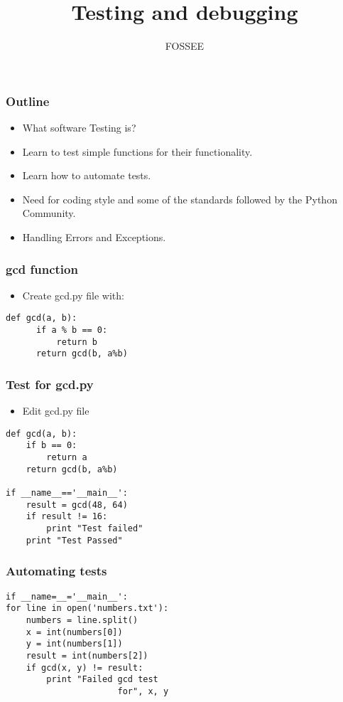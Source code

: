 \documentclass[presentation]{beamer}
\title{Testing and debugging}
\author{FOSSEE}
\date{}
\begin{document}
\maketitle









\begin{frame}
\frametitle{Outline}
\label{sec-1}

\begin{itemize}
\item What software Testing is?
\item Learn to test simple functions for their functionality.
\item Learn how to automate tests.
\item Need for coding style and some of the standards followed by the Python Community.
\item Handling Errors and Exceptions.
\end{itemize}
\end{frame}
\begin{frame}[fragile]
\frametitle{gcd function}
\label{sec-2}

\begin{itemize}
\item Create gcd.py file with:
\end{itemize}

\begin{verbatim}
def gcd(a, b):
      if a % b == 0: 
          return b
      return gcd(b, a%b)
\end{verbatim}
\end{frame}
\begin{frame}[fragile]
\frametitle{Test for gcd.py}
\label{sec-3}

\begin{itemize}
\item Edit gcd.py file
\end{itemize}

\begin{verbatim}
def gcd(a, b):
    if b == 0:
        return a
    return gcd(b, a%b)

if __name__=='__main__':
    result = gcd(48, 64)
    if result != 16:
        print "Test failed"
    print "Test Passed"
\end{verbatim}
\end{frame}
\begin{frame}[fragile]
\frametitle{Automating tests}
\label{sec-4}

\begin{verbatim}
if __name=__='__main__':
for line in open('numbers.txt'):
    numbers = line.split()
    x = int(numbers[0])
    y = int(numbers[1])
    result = int(numbers[2])
    if gcd(x, y) != result:
        print "Failed gcd test
                      for", x, y
\end{verbatim}
\end{frame}
\end{document}
